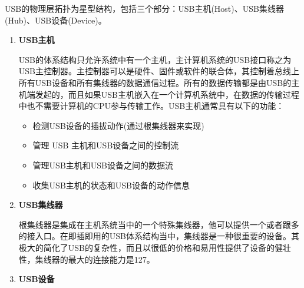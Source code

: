 	USB的物理层拓扑为星型结构，包括三个部分：USB主机(Host)、USB集线器(Hub)、USB设备(Device)。
	
\begin{enumerate}
\item \textbf{USB主机}

	USB的体系结构只允许系统中有一个主机，主计算机系统的USB接口称之为USB主控制器。主控制器可以是硬件、固件或软件的联合体，其控制着总线上所有USB设备和所有集线器的数据通信过程。所有的数据传输都是由USB的主机端发起的，而且如果USB主机嵌入在一个计算机系统中，在数据的传输过程中也不需要计算机的CPU参与传输工作。USB主机通常具有以下的功能：
	\begin{itemize}
	\item 检测USB设备的插拔动作(通过根集线器来实现)
	\item 管理 USB 主机和USB设备之间的控制流
	\item 管理USB主机和USB设备之间的数据流
	\item 收集USB主机的状态和USB设备的动作信息
	\end{itemize}
\item \textbf{USB集线器}
	
	根集线器是集成在主机系统当中的一个特殊集线器，他可以提供一个或者跟多的接入口。在即插即用的USB体系结构当中，集线器是一种很重要的设备。其极大的简化了USB的复杂性，而且以很低的价格和易用性提供了设备的健壮性，集线器的最大的连接能力是127。

\item \textbf{USB设备}


\end{enumerate}
